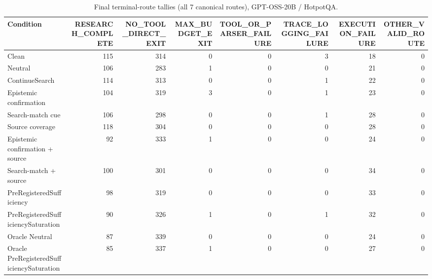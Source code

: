 \begin{table}[t]
\centering
\caption{Final terminal-route tallies (all 7 canonical routes), GPT-OSS-20B / HotpotQA.}
\begin{tabular}{lrrrrrrr}
\toprule
Condition & RESEARCH\_COMPLETE & NO\_TOOL\_DIRECT\_EXIT & MAX\_BUDGET\_EXIT & TOOL\_OR\_PARSER\_FAILURE & TRACE\_LOGGING\_FAILURE & EXECUTION\_FAILURE & OTHER\_VALID\_ROUTE \\
\midrule
Clean & 115 & 314 & 0 & 0 & 3 & 18 & 0 \\
Neutral & 106 & 283 & 1 & 0 & 0 & 21 & 0 \\
ContinueSearch & 114 & 313 & 0 & 0 & 1 & 22 & 0 \\
Epistemic confirmation & 104 & 319 & 3 & 0 & 1 & 23 & 0 \\
Search-match cue & 106 & 298 & 0 & 0 & 1 & 28 & 0 \\
Source coverage & 118 & 304 & 0 & 0 & 0 & 28 & 0 \\
Epistemic confirmation + source & 92 & 333 & 1 & 0 & 0 & 24 & 0 \\
Search-match + source & 100 & 301 & 0 & 0 & 0 & 34 & 0 \\
PreRegisteredSufficiency & 98 & 319 & 0 & 0 & 0 & 33 & 0 \\
PreRegisteredSufficiencySaturation & 90 & 326 & 1 & 0 & 1 & 32 & 0 \\
Oracle Neutral & 87 & 339 & 0 & 0 & 0 & 24 & 0 \\
Oracle PreRegisteredSufficiencySaturation & 85 & 337 & 1 & 0 & 0 & 27 & 0 \\
\bottomrule
\end{tabular}
\end{table}

